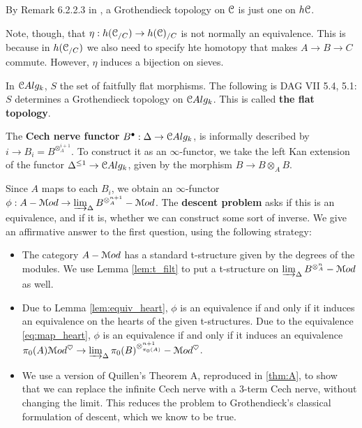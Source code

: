 By Remark 6.2.2.3 in \cite{HTT}, a Grothendieck topology on $\mathcal C$ is just one on $h\mathcal C$.

Note, though, that $\eta : h(\mathcal C_{/C}) \to h(\mathcal C)_{/C}$ is not normally an equivalence. This is because in $h(\mathcal C_{/C})$
we also need to specify hte homotopy that makes $A \to B \to C$ commute. However, $\eta$ induces a bijection on sieves.

In $\mathcal C Alg_k$, $S$ the set of faitfully flat morphisms. The following is DAG VII 5.4, 5.1: $S$
determines a Grothendieck topology on $\mathcal C Alg_k$. This is called \textbf{the flat topology}.

\begin{defin}
The \textbf{Cech nerve functor} $B^{\bullet} : \Delta \to \mathcal C Alg_k$, is informally described by $i \to B_i = B^{\otimes_A^{i+1}}$.
To construct it as an $\infty$-functor, we take the left Kan extension of the functor $\Delta^{\leq 1} \to \mathcal C Alg_k$, given
by the morphism $B \to B \otimes_A B$. 
\end{defin}


Since $A$ maps to each $B_i$, we obtain an $\infty$-functor $\phi: A-\mathcal M od \to \varinjlim_{\Delta} B^{\otimes_A^{n+1}} - \mathcal M od$.
The \textbf{descent problem} asks if this is an equivalence, and if it is,
whether we can construct some sort of inverse. We give an affirmative answer to the first question, using the following
strategy:
\begin{itemize}
\item The category $A-\mathcal M od$ has a standard t-structure given by the degrees of the modules. We use Lemma \ref{lem:t_filt}
to put a t-structure on $\varinjlim_{\Delta} B^{\otimes_A^{n}} - \mathcal M od$ as well.
\item Due to Lemma \ref{lem:equiv_heart}, $\phi$ is an equivalence if and only if it induces an equivalence on the hearts
of the given t-structures. Due to the equivalence \ref{eq:map_heart}, $\phi$ is an equivalence if and only if it induces
an equivalence $\pi_0(A) \mathcal M od^{\heartsuit} \to \varinjlim_{\Delta} \pi_0(B)^{\otimes_{\pi_0(A)}^{n+1}} - \mathcal M od^{\heartsuit}$.
\item We use a version of Quillen's Theorem A, reproduced in \ref{thm:A}, to show that we can replace the infinite Cech nerve
with a 3-term Cech nerve, without changing the limit. This reduces the problem to Grothendieck's classical formulation of 
descent, which we know to be true.
\end{itemize}



